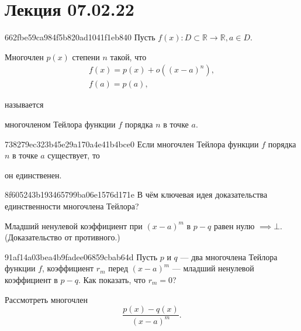 


\section{Лекция 07.02.22}
\begin{note}{662fbe59ca984f5b820ad1041f1eb840}
    Пусть \( f(x) : D \subset \mathbb R  \to \mathbb R, a \in D. \)
    \begin{icloze}{2}Многочлен \( p(x) \) степени \( n \)  такой, что \[
        \begin{gathered}
            f(x) = p(x) + o((x - a)^{n}), \\
            f(a) = p(a),
        \end{gathered}
    \]\end{icloze}
    называется \begin{icloze}{1}многочленом Тейлора функции \( f \) порядка \( n \) в точке \( a. \)\end{icloze}
\end{note}

\begin{note}{738279ec323b45e29a170a4e41b4bce0}
    Если многочлен Тейлора функции \( f \) порядка \( n \) в точке \( a \) существует, то \begin{icloze}{1}он единственен.\end{icloze}
\end{note}

\begin{note}{8f605243b193465799ba06e1576d171e}
    В чём ключевая идея доказательства единственности многочлена Тейлора?

    \begin{cloze}{1}
        Младший ненулевой коэффициент при \({ (x - a)^{m} }\) в \({ p - q }\) равен нулю \({ \implies \bot }\). (Доказательство от противного.)
    \end{cloze}
\end{note}

\begin{note}{91af14a03bea4b9fadee06859cbab64d}
    Пусть \({ p }\) и \({ q }\) --- два многочлена Тейлора функции \({ f }\),\: коэффициент \({ r_m }\) перед \({ (x - a)^{m} }\) --- младший ненулевой коэффициент в \({ p - q }\). Как показать, что \({ r_m = 0 }\)?

    \begin{cloze}{1}
        Рассмотреть многочлен
        \[
            \frac{p(x) - q(x)}{(x - a)^{m}}.
        \]
    \end{cloze}
\end{note}

